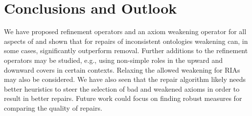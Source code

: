 \documentclass[
]{ceurart}
\begin{document}
\section{Conclusions and Outlook}

We have proposed refinement operators and an axiom weakening operator for all aspects of \SROIQ and shown that for repairs of inconsistent ontologies weakening can, in some cases, significantly outperform removal. Further additions to the refinement operators may be studied, e.g., using non-simple roles in the upward and downward covers in certain contexts. Relaxing the allowed weakening for RIAs may also be considered. We have also seen that the repair algorithm likely needs better heuristics to steer the selection of bad and weakened axioms in order to result in better repairs. Future work could focus on finding robust measures for comparing the quality of repairs.



\appendix
\end{document}
